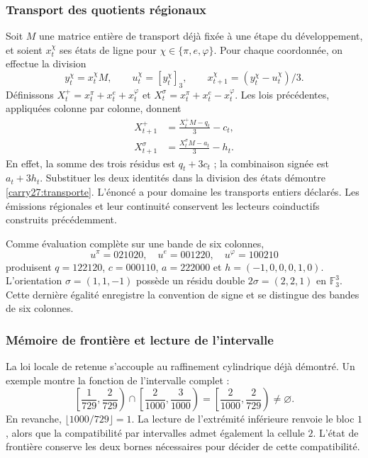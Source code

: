 \subsubsection{Transport des quotients régionaux}

Soit \(M\) une matrice entière de transport déjà fixée à une étape
du développement, et soient \(x_t^\chi\) ses états de ligne pour
\(\chi\in\{\pi,e,\varphi\}\). Pour chaque coordonnée, on effectue
la division
\[
y_t^\chi=x_t^\chi M,\qquad
u_t^\chi=[y_t^\chi]_3,\qquad
x_{t+1}^\chi=(y_t^\chi-u_t^\chi)/3.
\]
Définissons \(X_t^+=x_t^\pi+x_t^e+x_t^\varphi\) et
\(X_t^\sigma=x_t^\pi+x_t^e-x_t^\varphi\).
Les lois précédentes, appliquées colonne par colonne, donnent
\begin{equation}
\begin{aligned}
X_{t+1}^+&=\frac{X_t^+M-q_t}{3}-c_t,\\
X_{t+1}^\sigma&=\frac{X_t^\sigma M-a_t}{3}-h_t.
\end{aligned}
\label{carry27:transporte}
\end{equation}
En effet, la somme des trois résidus est \(q_t+3c_t\) ; la combinaison signée est \(a_t+3h_t\). Substituer les deux identités dans la division des états démontre \eqref{carry27:transporte}. L'énoncé a pour domaine les transports entiers déclarés. Les émissions régionales et leur continuité conservent les lecteurs coinductifs construits précédemment.

Comme évaluation complète sur une bande de six colonnes,
\[
u^\pi=021020,\quad u^e=001220,\quad u^\varphi=100210
\]
produisent \(q=122120\), \(c=000110\), \(a=222000\) et  
\(h=(-1,0,0,0,1,0)\). L'orientation  
\(\sigma=(1,1,-1)\) possède un résidu double  
\(2\sigma=(2,2,1)\) en \(\mathbb F_3^3\). Cette dernière  
égalité enregistre la convention de signe et se distingue des  
bandes de six colonnes.

\subsubsection{Mémoire de frontière et lecture de l'intervalle}

La loi locale de retenue s'accouple au raffinement cylindrique
déjà démontré. Un exemple montre la fonction de l'intervalle
complet :
\[
\left[\frac1{729},\frac2{729}\right)
\cap
\left[\frac2{1000},\frac3{1000}\right)
=
\left[\frac2{1000},\frac2{729}\right)\ne\varnothing.
\]
En revanche,  
\(\lfloor1000/729\rfloor=1\).  
La lecture de l'extrémité inférieure renvoie le bloc \(1\),  
alors que la compatibilité par intervalles admet également la  
cellule \(2\). L'état de frontière conserve les deux bornes  
nécessaires pour décider de cette compatibilité.

